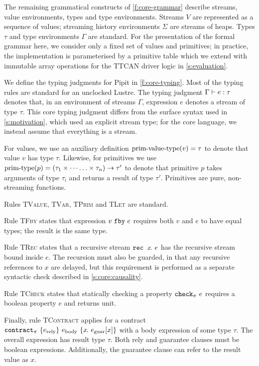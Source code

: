 The remaining grammatical constructs of \autoref{f:core-grammar} describe streams, value environments, types and type environments.
Streams $V$ are represented as a sequence of values; streaming history environments $\Sigma$ are streams of heaps.
Types $\tau$ and type environments $\Gamma$ are standard.
For the presentation of the formal grammar here, we consider only a fixed set of values and primitives; in practice, the implementation is parameterised by a primitive table which we extend with immutable array operations for the TTCAN driver logic in \autoref{s:evaluation}.



We define the typing judgments for Pipit in \autoref{f:core-typing}.
Most of the typing rules are standard for an unclocked Lustre.
The typing judgment $\Gamma \vdash e : \tau$ denotes that, in an environment of streams $\Gamma$, expression $e$ denotes a stream of type $\tau$.
This core typing judgment differs from the surface syntax used in \autoref{s:motivation}, which used an explicit stream type; for the core language, we instead assume that everything is a stream.

For values, we use an auxiliary definition $\text{prim-value-type}(v) = \tau$ to denote that value $v$ has type $\tau$.
Likewise, for primitives we use $\text{prim-type}(p) = (\tau_1 \times \cdots \hdots \times \tau_n) \to \tau'$ to denote that primitive $p$ takes arguments of type $\tau_i$ and returns a result of type $\tau'$.
Primitives are pure, non-streaming functions.

Rules \textsc{TValue}, \textsc{TVar}, \textsc{TPrim} and \textsc{TLet} are standard.

Rule \textsc{TFby} states that expression $v~\texttt{fby}~e$ requires both $v$ and $e$ to have equal types; the result is the same type.

Rule \textsc{TRec} states that a recursive stream $\texttt{rec~} x\hspace{-0.1em}.~e$ has the recursive stream bound inside $e$.
The recursion must also be guarded, in that any recursive references to $x$ are delayed, but this requirement is performed as a separate syntactic check described in \autoref{s:core:causality}.

Rule \textsc{TCheck} states that statically checking a property $\texttt{check}_{\pi}~e$ requires a boolean property $e$ and returns unit.

Finally, rule \textsc{TContract} applies for a contract $\texttt{contract}_{\pi}~\{e_{\text{rely}}\}~e_{\text{body}}~\{x\hspace{-0.1em}.~e_{\text{guar}}[x]\}$ with a body expression of some type $\tau$.
The overall expression has result type $\tau$.
Both rely and guarantee clauses must be boolean expressions.
Additionally, the guarantee clause can refer to the result value as $x$.

